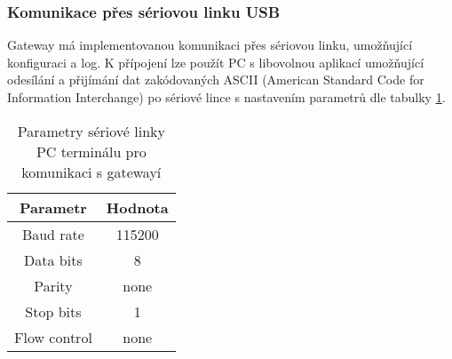 

\subsubsection{Komunikace přes sériovou linku USB}
\label{Komunikace přes sériovou linku}
Gateway má implementovanou komunikaci přes sériovou linku, umožňující konfiguraci a log. 
K přípojení lze použít PC s libovolnou aplikací umožňující odesílání a přijímání dat zakódovaných ASCII (American Standard Code for Information Interchange) po
sériové lince s nastavením parametrů dle tabulky \ref{table:usb_term}.

\begin{table}[!h]
    \centering
    \begin{ctucolortab}
    \begin{tabular}{ |c|c| }
     \hline

    Parametr                & Hodnota           \\ \hline \hline
     Baud rate              & 115200           \\ \hline
     Data bits              & 8                 \\ \hline
     Parity                 & none              \\ \hline
     Stop bits              & 1                 \\ \hline
     Flow control           & none               \\ \hline

    \end{tabular}
    \end{ctucolortab}
    \caption{Parametry sériové linky PC terminálu pro komunikaci s gatewayí}
    \label{table:usb_term}
\end{table}

